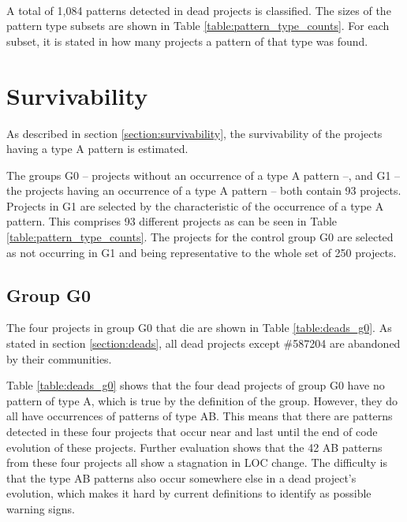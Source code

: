 \paragraph{}
A total of 1,084 patterns detected in dead projects is classified. The sizes of
the pattern type subsets are shown in Table \ref{table:pattern_type_counts}.
For each subset, it is stated in how many projects a pattern of that type was
found.



\section{Survivability}
As described in section \ref{section:survivability}, the survivability of the
projects having a type A pattern is estimated.

The groups G0 -- projects without an occurrence of a type A pattern --, and G1
-- the projects having an occurrence of a type A pattern -- both contain 93
projects. Projects in G1 are selected by the characteristic of the occurrence
of a type A pattern. This comprises 93 different projects as can be seen in
Table \ref{table:pattern_type_counts}. The projects for the control group G0
are selected as not occurring in G1 and being representative to the whole set
of 250 projects.

\subsection{Group G0}
\label{section:group_g0}
The four projects in group G0 that die are shown in Table \ref{table:deads_g0}.
As stated in section \ref{section:deads}, all dead projects except \#587204 are
abandoned by their communities.



\noindent
Table \ref{table:deads_g0} shows that the four dead projects of group G0 have
no pattern of type A, which is true by the definition of the group. However,
they do all have occurrences of patterns of type AB. This means that there are
patterns detected in these four projects that occur near and last until the end
of code evolution of these projects. Further evaluation shows that the 42 AB
patterns from these four projects all show a stagnation in LOC change. The
difficulty is that the type AB patterns also occur somewhere else in a dead
project's evolution, which makes it hard by current definitions to identify as
possible warning signs.

